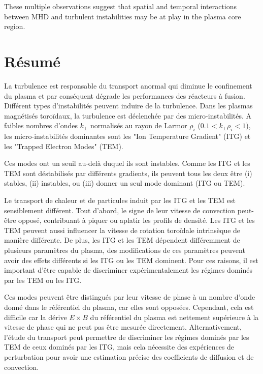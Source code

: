 These multiple observations suggest that spatial and temporal interactions between MHD and turbulent instabilities may be at play in the plasma core region.





\section*{R\'esum\'e}
La turbulence est responsable du transport anormal qui diminue le confinement du plasma et par conséquent dégrade les performances des réacteurs à fusion. Différent types d’instabilités peuvent induire de la turbulence. Dans les plasmas magnétisés toroïdaux, la turbulence est déclenchée par des micro-instabilités. A faibles nombres d’ondes $k_{\perp}$ normalisés au rayon de Larmor $\rho_i$ ($0.1<k_{\perp}\rho_i<1$), les micro-instabilités dominantes sont les "Ion Temperature Gradient" (ITG) et les "Trapped Electron Modes" (TEM).

Ces modes ont un seuil au-delà duquel ils sont instables. Comme les ITG et les TEM sont déstabilisés par différents gradients, ils peuvent tous les deux être (i) stables, (ii) instables, ou (iii) donner un seul mode dominant (ITG ou TEM).

Le transport de chaleur et de particules induit par les ITG et les TEM est sensiblement différent. Tout d’abord, le signe de leur vitesse de convection peut-être opposé, contribuant à piquer ou aplatir les profils de densité. Les ITG et les TEM peuvent aussi influencer la vitesse de rotation toroïdale intrinsèque de manière différente. De plus, les ITG et les TEM dépendent différemment de plusieurs paramètres du plasma, des modifications de ces paramètres peuvent avoir des effets différents si les ITG ou les TEM dominent. Pour ces raisons, il est important d’être capable de discriminer expérimentalement les régimes dominés par les TEM ou les ITG.

Ces modes peuvent être distingués par leur vitesse de phase à un nombre d’onde donné dans le référentiel du plasma, car elles sont opposées. Cependant, cela est difficile car la dérive $E\times B$ du référentiel du plasma est nettement supérieure à la vitesse de phase qui ne peut pas être mesurée directement. Alternativement, l’étude du transport peut permettre de discriminer les régimes dominés par les TEM de ceux dominés par les ITG, mais cela nécessite des expériences de perturbation pour avoir une estimation précise des coefficients de diffusion et de convection.

